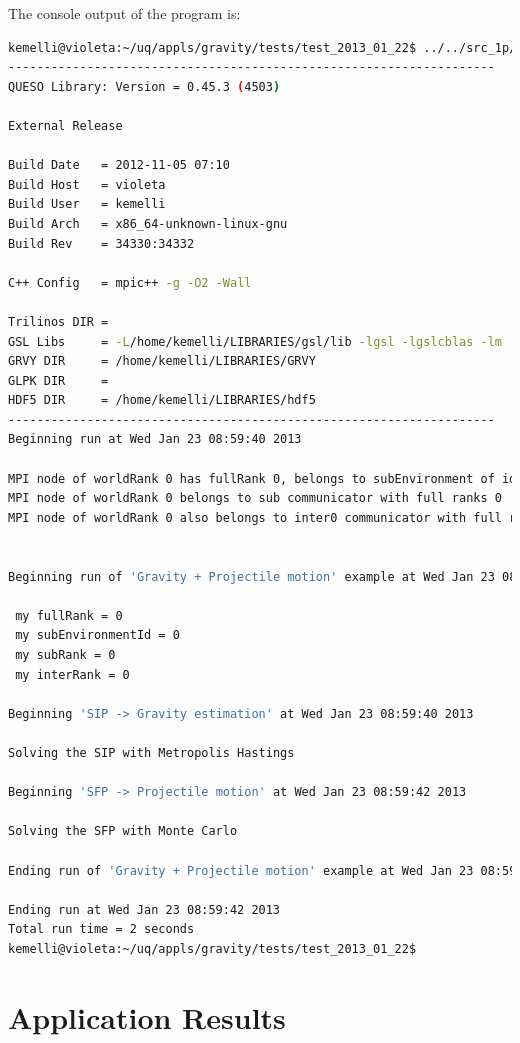 The console output of the program is:
\begin{lstlisting}[caption={Console output of program \texttt{gravity\_gsl}}, label={code:console_output},language={bash}]
kemelli@violeta:~/uq/appls/gravity/tests/test_2013_01_22$ ../../src_1p/gravity_gsl gravity_inv_fwd.inp 
--------------------------------------------------------------------
QUESO Library: Version = 0.45.3 (4503)

External Release

Build Date   = 2012-11-05 07:10
Build Host   = violeta
Build User   = kemelli
Build Arch   = x86_64-unknown-linux-gnu
Build Rev    = 34330:34332

C++ Config   = mpic++ -g -O2 -Wall

Trilinos DIR = 
GSL Libs     = -L/home/kemelli/LIBRARIES/gsl/lib -lgsl -lgslcblas -lm
GRVY DIR     = /home/kemelli/LIBRARIES/GRVY
GLPK DIR     = 
HDF5 DIR     = /home/kemelli/LIBRARIES/hdf5
--------------------------------------------------------------------
Beginning run at Wed Jan 23 08:59:40 2013

MPI node of worldRank 0 has fullRank 0, belongs to subEnvironment of id 0, and has subRank 0
MPI node of worldRank 0 belongs to sub communicator with full ranks 0
MPI node of worldRank 0 also belongs to inter0 communicator with full ranks 0, and has inter0Rank 0


Beginning run of 'Gravity + Projectile motion' example at Wed Jan 23 08:59:40 2013

 my fullRank = 0
 my subEnvironmentId = 0
 my subRank = 0
 my interRank = 0

Beginning 'SIP -> Gravity estimation' at Wed Jan 23 08:59:40 2013

Solving the SIP with Metropolis Hastings

Beginning 'SFP -> Projectile motion' at Wed Jan 23 08:59:42 2013

Solving the SFP with Monte Carlo

Ending run of 'Gravity + Projectile motion' example at Wed Jan 23 08:59:42 2013

Ending run at Wed Jan 23 08:59:42 2013
Total run time = 2 seconds
kemelli@violeta:~/uq/appls/gravity/tests/test_2013_01_22$ 
\end{lstlisting}

\section{Application Results}\label{sec:application_results}

